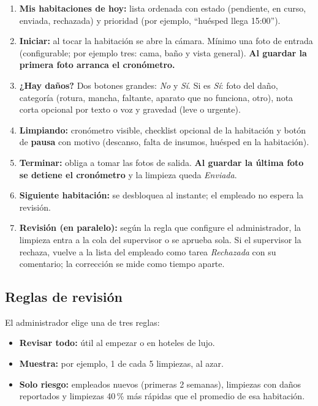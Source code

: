 \documentclass[11pt,a4paper]{article}
\begin{document}
\begin{enumerate}[leftmargin=1.4em]
  \item \textbf{Mis habitaciones de hoy:} lista ordenada con estado (pendiente, en curso, enviada, rechazada) y prioridad (por ejemplo, \enquote{huésped llega 15:00}).
  \item \textbf{Iniciar:} al tocar la habitación se abre la cámara. Mínimo una foto de entrada (configurable; por ejemplo tres: cama, baño y vista general). \textbf{Al guardar la primera foto arranca el cronómetro.}
  \item \textbf{¿Hay daños?} Dos botones grandes: \emph{No} y \emph{Sí}. Si es \emph{Sí}: foto del daño, categoría (rotura, mancha, faltante, aparato que no funciona, otro), nota corta opcional por texto o voz y gravedad (leve o urgente).
  \item \textbf{Limpiando:} cronómetro visible, checklist opcional de la habitación y botón de \textbf{pausa} con motivo (descanso, falta de insumos, huésped en la habitación).
  \item \textbf{Terminar:} obliga a tomar las fotos de salida. \textbf{Al guardar la última foto se detiene el cronómetro} y la limpieza queda \emph{Enviada}.
  \item \textbf{Siguiente habitación:} se desbloquea al instante; el empleado no espera la revisión.
  \item \textbf{Revisión (en paralelo):} según la regla que configure el administrador, la limpieza entra a la cola del supervisor o se aprueba sola. Si el supervisor la rechaza, vuelve a la lista del empleado como tarea \emph{Rechazada} con su comentario; la corrección se mide como tiempo aparte.
\end{enumerate}

\subsection{Reglas de revisión}

El administrador elige una de tres reglas:

\begin{itemize}[leftmargin=1.2em]
  \item \textbf{Revisar todo:} útil al empezar o en hoteles de lujo.
  \item \textbf{Muestra:} por ejemplo, 1 de cada 5 limpiezas, al azar.
  \item \textbf{Solo riesgo:} empleados nuevos (primeras 2 semanas), limpiezas con daños reportados y limpiezas 40\,\% más rápidas que el promedio de esa habitación.
\end{itemize}
\end{document}
